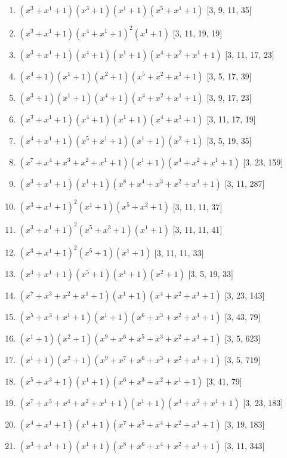\documentclass[10pt,twocolumn]{article}
\begin{document}
\begin{enumerate}
\item $(x^{3} + x^{1} + 1)(x^{3} + 1)(x^{1} + 1)(x^{5} + x^{1} + 1)$  [3, 9, 11, 35]
\item $(x^{3} + x^{1} + 1)(x^{4} + x^{1} + 1)^{2}(x^{1} + 1)$  [3, 11, 19, 19]
\item $(x^{3} + x^{1} + 1)(x^{4} + 1)(x^{1} + 1)(x^{4} + x^{2} + x^{1} + 1)$  [3, 11, 17, 23]
\item $(x^{4} + 1)(x^{1} + 1)(x^{2} + 1)(x^{5} + x^{2} + x^{1} + 1)$  [3, 5, 17, 39]
\item $(x^{3} + 1)(x^{1} + 1)(x^{4} + 1)(x^{4} + x^{2} + x^{1} + 1)$  [3, 9, 17, 23]
\item $(x^{3} + x^{1} + 1)(x^{4} + 1)(x^{1} + 1)(x^{4} + x^{1} + 1)$  [3, 11, 17, 19]
\item $(x^{4} + x^{1} + 1)(x^{5} + x^{1} + 1)(x^{1} + 1)(x^{2} + 1)$  [3, 5, 19, 35]
\item $(x^{7} + x^{4} + x^{3} + x^{2} + x^{1} + 1)(x^{1} + 1)(x^{4} + x^{2} + x^{1} + 1)$  [3, 23, 159]
\item $(x^{3} + x^{1} + 1)(x^{1} + 1)(x^{8} + x^{4} + x^{3} + x^{2} + x^{1} + 1)$  [3, 11, 287]
\item $(x^{3} + x^{1} + 1)^{2}(x^{1} + 1)(x^{5} + x^{2} + 1)$  [3, 11, 11, 37]
\item $(x^{3} + x^{1} + 1)^{2}(x^{5} + x^{3} + 1)(x^{1} + 1)$  [3, 11, 11, 41]
\item $(x^{3} + x^{1} + 1)^{2}(x^{5} + 1)(x^{1} + 1)$  [3, 11, 11, 33]
\item $(x^{4} + x^{1} + 1)(x^{5} + 1)(x^{1} + 1)(x^{2} + 1)$  [3, 5, 19, 33]
\item $(x^{7} + x^{3} + x^{2} + x^{1} + 1)(x^{1} + 1)(x^{4} + x^{2} + x^{1} + 1)$  [3, 23, 143]
\item $(x^{5} + x^{3} + x^{1} + 1)(x^{1} + 1)(x^{6} + x^{3} + x^{2} + x^{1} + 1)$  [3, 43, 79]
\item $(x^{1} + 1)(x^{2} + 1)(x^{9} + x^{6} + x^{5} + x^{3} + x^{2} + x^{1} + 1)$  [3, 5, 623]
\item $(x^{1} + 1)(x^{2} + 1)(x^{9} + x^{7} + x^{6} + x^{3} + x^{2} + x^{1} + 1)$  [3, 5, 719]
\item $(x^{5} + x^{3} + 1)(x^{1} + 1)(x^{6} + x^{3} + x^{2} + x^{1} + 1)$  [3, 41, 79]
\item $(x^{7} + x^{5} + x^{4} + x^{2} + x^{1} + 1)(x^{1} + 1)(x^{4} + x^{2} + x^{1} + 1)$  [3, 23, 183]
\item $(x^{4} + x^{1} + 1)(x^{1} + 1)(x^{7} + x^{5} + x^{4} + x^{2} + x^{1} + 1)$  [3, 19, 183]
\item $(x^{3} + x^{1} + 1)(x^{1} + 1)(x^{8} + x^{6} + x^{4} + x^{2} + x^{1} + 1)$  [3, 11, 343]

\end{enumerate}
\end{document}
